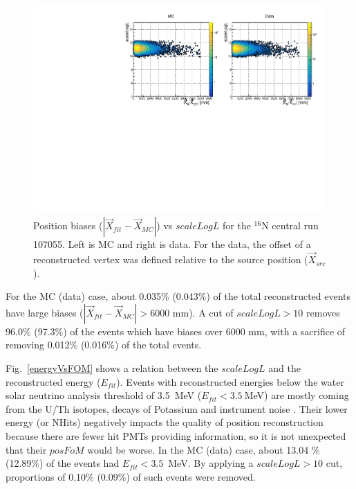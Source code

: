 \begin{figure}
	\centering
	\includegraphics[width=13cm]{N16_107055_scaleLogLvsPosBias.pdf}
	\caption[Position biases vs $scaleLogL$ for the $^{16}$N central run 107055.]{Position biases ($|\vec{X}_{fit}-\vec{X}_{MC}|$) vs $scaleLogL$ for the $^{16}$N central run 107055. Left is MC and right is data. For the data, the offset of a reconstructed vertex was defined relative to the source position ($\vec{X}_{src}$).\label{posBiasVsFOM}}
\end{figure}

For the MC (data) case, about 0.035\% (0.043\%) of the total reconstructed events have large biases ($|\vec{X}_{fit}-\vec{X}_{MC}|>6000$ mm). A cut of $scaleLogL>10$ removes 96.0\% (97.3\%) of the events which have biases over 6000 mm, with a sacrifice of removing 0.012\% (0.016\%) of the total events.

Fig.~\ref{energyVsFOM} shows a relation between the $scaleLogL$ and the reconstructed energy ($E_{fit}$). Events with reconstructed energies below the water solar neutrino analysis threshold of 3.5~MeV ($E_{fit}<3.5~$MeV) are mostly coming from the U/Th isotopes, decays of Potassium and instrument noise \cite{waterunidoc}. Their lower energy (or NHits) negatively impacts the quality of position reconstruction because there are fewer hit PMTs providing information, so it is not unexpected that their $posFoM$ would be worse. In the MC (data) case, about 13.04 \% (12.89\%) of the events had $E_{fit}<3.5$~MeV. By applying a $scaleLogL>10$ cut, proportions of 0.10\% (0.09\%) of such events were removed.

